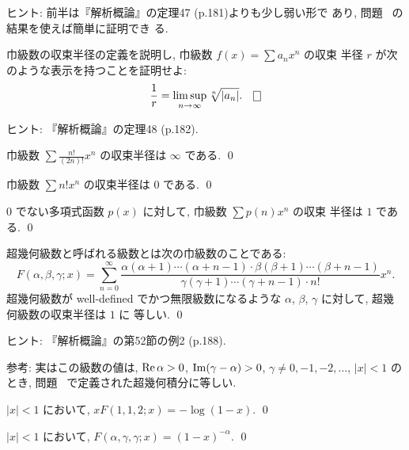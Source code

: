 \documentclass[12pt,twoside]{jarticle}
\begin{document}
\noindent ヒント: 前半は『解析概論』の定理47 (p.181)よりも少し弱い形で
あり, 問題 \ の結果を使えば簡単に証明でき
る.

\begin{question}
  巾級数の収束半径の定義を説明し, 巾級数 $f(x) = \sum a_n x^n$ の収束
  半径 $r$ が次のような表示を持つことを証明せよ:
  \[
    \frac{1}{r} = \limsup_{n\to\infty} \sqrt[n]{|a_n|}.
  \qed
  \]
\end{question}

\noindent ヒント: 『解析概論』の定理48 (p.182).

\begin{question}
  巾級数 $\sum \frac{n!}{(2n)!} x^n$ の収束半径は $\infty$ である. 
  \qed
\end{question}

\begin{question}
  巾級数 $\sum n! x^n$ の収束半径は $0$ である. \qed
\end{question}

\begin{question}
  $0$ でない多項式函数 $p(x)$ に対して, 巾級数 $\sum p(n) x^n$ の収束
  半径は $1$ である. \qed
\end{question}

\begin{question}[超幾何級数]\label{q:hypergeom-series}
  超幾何級数と呼ばれる級数とは次の巾級数のことである:
  \[
    F(\alpha, \beta, \gamma; x)
    =
    \sum_{n=0}^\infty
    \frac{
      \alpha (\alpha + 1) \cdots (\alpha + n - 1)
      \cdot
      \beta (\beta + 1) \cdots (\beta + n - 1)
      }{
      \gamma (\gamma + 1) \cdots (\gamma + n -1)
      \cdot
      n!
      }
    x^n.
  \]%
  超幾何級数が well-defined でかつ無限級数になるような %
  $\alpha$, $\beta$, $\gamma$ に対して, 超幾何級数の収束半径は $1$ に
  等しい.  \qed
\end{question}

\noindent ヒント: 『解析概論』の第52節の例2 (p.188).

\noindent 参考: 実はこの級数の値は, $\mathop{\mathrm{Re}}\nolimits \alpha > 0$, %
$\mathop{\mathrm{Im}}\nolimits(\gamma-\alpha) > 0$, %
$\gamma \ne 0,-1,-2, \dots$, $|x|<1$ のとき, 問題 %
\ で定義された超幾何積分に等しい.

\begin{question}
  $|x|<1$ において, $x F(1,1,2;x) = - \log(1 - x)$. \qed
\end{question}

\begin{question}
  $|x|<1$ において, $F(\alpha,\gamma,\gamma; x) = (1 - x)^{-\alpha}$.
  \qed
\end{question}
\end{document}
